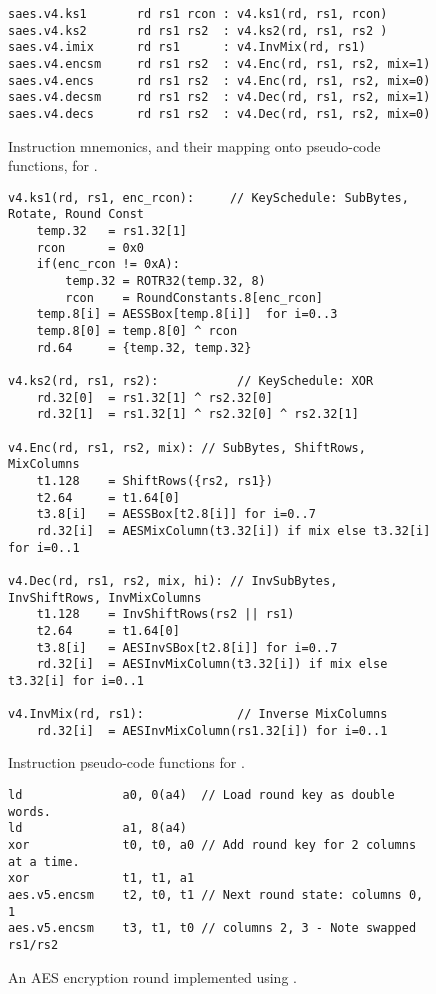
\begin{figure}[!h]
\begin{lstlisting}[language=pseudo,style=block]
saes.v4.ks1       rd rs1 rcon : v4.ks1(rd, rs1, rcon)
saes.v4.ks2       rd rs1 rs2  : v4.ks2(rd, rs1, rs2 )
saes.v4.imix      rd rs1      : v4.InvMix(rd, rs1)
saes.v4.encsm     rd rs1 rs2  : v4.Enc(rd, rs1, rs2, mix=1)
saes.v4.encs      rd rs1 rs2  : v4.Enc(rd, rs1, rs2, mix=0)
saes.v4.decsm     rd rs1 rs2  : v4.Dec(rd, rs1, rs2, mix=1)
saes.v4.decs      rd rs1 rs2  : v4.Dec(rd, rs1, rs2, mix=0)
\end{lstlisting}
\caption{
  Instruction mnemonics, and their mapping onto pseudo-code functions, for .
}
\label{fig:v4:mnemonics}
\end{figure}

\begin{figure}[!h]
\begin{lstlisting}[language=pseudo,style=block]
v4.ks1(rd, rs1, enc_rcon):     // KeySchedule: SubBytes, Rotate, Round Const
    temp.32   = rs1.32[1]
    rcon      = 0x0
    if(enc_rcon != 0xA):
        temp.32 = ROTR32(temp.32, 8)
        rcon    = RoundConstants.8[enc_rcon]
    temp.8[i] = AESSBox[temp.8[i]]  for i=0..3
    temp.8[0] = temp.8[0] ^ rcon
    rd.64     = {temp.32, temp.32}

v4.ks2(rd, rs1, rs2):           // KeySchedule: XOR
    rd.32[0]  = rs1.32[1] ^ rs2.32[0]
    rd.32[1]  = rs1.32[1] ^ rs2.32[0] ^ rs2.32[1]

v4.Enc(rd, rs1, rs2, mix): // SubBytes, ShiftRows, MixColumns
    t1.128    = ShiftRows({rs2, rs1})
    t2.64     = t1.64[0]
    t3.8[i]   = AESSBox[t2.8[i]] for i=0..7
    rd.32[i]  = AESMixColumn(t3.32[i]) if mix else t3.32[i] for i=0..1

v4.Dec(rd, rs1, rs2, mix, hi): // InvSubBytes, InvShiftRows, InvMixColumns
    t1.128    = InvShiftRows(rs2 || rs1)
    t2.64     = t1.64[0]
    t3.8[i]   = AESInvSBox[t2.8[i]] for i=0..7
    rd.32[i]  = AESInvMixColumn(t3.32[i]) if mix else t3.32[i] for i=0..1

v4.InvMix(rd, rs1):             // Inverse MixColumns
    rd.32[i]  = AESInvMixColumn(rs1.32[i]) for i=0..1
\end{lstlisting}
\caption{
  Instruction pseudo-code functions for .
}
\label{fig:v4:pseudo}
\end{figure}

\begin{figure}[!h]
\begin{lstlisting}[language=pseudo,style=block]
ld              a0, 0(a4)  // Load round key as double words.
ld              a1, 8(a4)
xor             t0, t0, a0 // Add round key for 2 columns at a time.
xor             t1, t1, a1
aes.v5.encsm    t2, t0, t1 // Next round state: columns 0, 1
aes.v5.encsm    t3, t1, t0 // columns 2, 3 - Note swapped rs1/rs2
\end{lstlisting}
\caption{
  An AES encryption round implemented using .
}
\label{fig:v4:round}
\end{figure}

